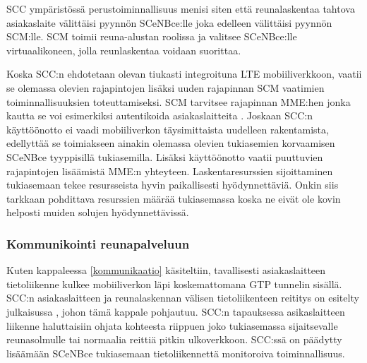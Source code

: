 SCC ympäristössä perustoiminnallisuus menisi siten että reunalaskentaa tahtova asiakaslaite välittäisi pyynnön SCeNBce:lle joka edelleen välittäisi pyynnön SCM:lle.
SCM toimii reuna-alustan roolissa ja valitsee SCeNBce:lle virtuaalikoneen, jolla reunlaskentaa voidaan suorittaa. \cite{dolezal2016performance}


Koska SCC:n ehdotetaan olevan tiukasti integroituna LTE mobiiliverkkoon, vaatii se olemassa olevien rajapintojen lisäksi uuden rajapinnan SCM vaatimien toiminnallisuuksien toteuttamiseksi. SCM tarvitsee rajapinnan MME:hen jonka kautta se voi esimerkiksi autentikoida asiakaslaitteita \cite{lobillo15scc}. 
Joskaan SCC:n käyttöönotto ei vaadi mobiiliverkon täysimittaista uudelleen rakentamista, edellyttää se toimiakseen ainakin olemassa olevien tukiasemien korvaamisen SCeNBce tyyppisillä tukiasemilla. Lisäksi käyttöönotto vaatii puuttuvien rajapintojen lisäämistä MME:n yhteyteen. 
Laskentaresurssien sijoittaminen tukiasemaan tekee resursseista hyvin paikallisesti hyödynnettäviä. Onkin siis tarkkaan pohdittava resurssien määrää tukiasemassa koska ne eivät ole kovin helposti muiden solujen hyödynnettävissä.

 
%

\subsubsection{Kommunikointi reunapalveluun} \label{GTP}
Kuten kappaleessa \ref{kommunikaatio} käsiteltiin, tavallisesti asiakaslaitteen tietoliikenne kulkee mobiiliverkon läpi koskemattomana GTP tunnelin sisällä. 
SCC:n asiakaslaitteen ja reunalaskennan välisen tietoliikenteen reititys on esitelty julkaisussa \cite{puente15seamless}, johon tämä kappale pohjautuu.
SCC:n tapauksessa asikaslaitteen liikenne haluttaisiin ohjata kohteesta riippuen joko tukiasemassa sijaitsevalle reunasolmulle tai normaalia reittiä pitkin ulkoverkkoon.
SCC:ssä on päädytty lisäämään SCeNBce tukiasemaan tietoliikennettä monitoroiva toiminnallisuus.

